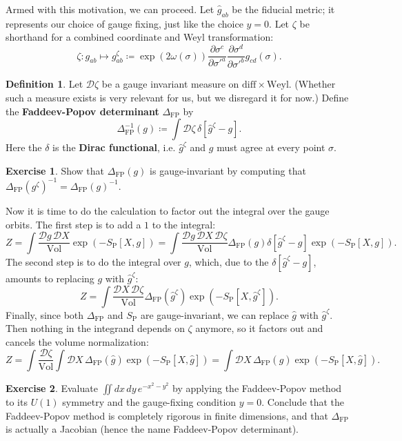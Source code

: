 \documentclass{report}
\theoremstyle{plain}
\theoremstyle{definition}
\newtheorem{definition}[theorem]{Definition}
\newtheorem{exercise}{Exercise}[section]
\theoremstyle{remark}
\newcommand{\cD}{\mathcal{D}}
\newcommand{\diff}{\mathrm{diff}}
\newcommand{\Weyl}{\mathrm{Weyl}}
\newcommand{\detFP}{\Delta_{\text{FP}}}
\DeclareMathOperator{\Vol}{Vol}
\newcommand{\pder}[2]{\frac{\partial #1}{\partial #2}}
\begin{document}
Armed with this motivation, we can proceed. Let $\hat{g}_{ab}$ be the
fiducial metric; it represents our choice of gauge fixing, just like
the choice $y = 0$. Let $\zeta$ be shorthand for a combined coordinate
and Weyl transformation:
\[ \zeta\colon g_{ab} \mapsto g^\zeta_{ab} \coloneqq \exp(2\omega(\sigma)) \pder{\sigma^c}{\sigma'^a} \pder{\sigma^d}{\sigma'^b} g_{cd}(\sigma). \]

\begin{definition}
  Let $\cD \zeta$ be a gauge invariant measure on $\diff \times
  \Weyl$. (Whether such a measure exists is very relevant for us, but
  we disregard it for now.) Define the {\bf Faddeev-Popov determinant}
  $\detFP$ by
  \[ \detFP^{-1}(g) \coloneqq \int \cD \zeta \, \delta[\hat{g}^\zeta - g]. \]
  Here the $\delta$ is the {\bf Dirac functional}, i.e.
  $\hat{g}^\zeta$ and $g$ must agree at every point $\sigma$.
\end{definition}

\begin{exercise}
  Show that $\detFP(g)$ is gauge-invariant by computing that
  $\detFP(g^\zeta)^{-1} = \detFP(g)^{-1}$.
\end{exercise}

Now it is time to do the calculation to factor out the integral over
the gauge orbits. The first step is to add a $1$ to the integral:
\[ Z = \int \frac{\cD g \, \cD X}{\Vol} \exp(-S_{\text{P}}[X, g]) = \int \frac{\cD g \, \cD X \, \cD \zeta}{\Vol} \detFP(g) \delta[\hat{g}^\zeta - g] \exp(-S_{\text{P}}[X, g]). \]
The second step is to do the integral over $g$, which, due to the
$\delta[\hat{g}^\zeta - g]$, amounts to replacing $g$ with
$\hat{g}^\zeta$:
\[ Z = \int \frac{\cD X \, \cD \zeta}{\Vol} \detFP(\hat{g}^\zeta)\exp(-S_{\text{P}}[X, \hat{g}^\zeta]). \]
Finally, since both $\detFP$ and $S_{\text{P}}$ are gauge-invariant,
we can replace $\hat{g}$ with $\hat{g}^\zeta$. Then nothing in the
integrand depends on $\zeta$ anymore, so it factors out and cancels
the volume normalization:
\[ Z = \int \frac{\cD \zeta}{\Vol} \int \cD X \, \detFP(\hat{g}) \exp(-S_{\text{P}}[X, \hat{g}]) = \int \cD X \, \detFP(\hat{g}) \exp(-S_{\text{P}}[X, \hat{g}]). \]

\begin{exercise}
  Evaluate $\iint dx \, dy \, e^{-x^2 - y^2}$ by applying the
  Faddeev-Popov method to its $U(1)$ symmetry and the gauge-fixing
  condition $y = 0$. Conclude that the Faddeev-Popov method is
  completely rigorous in finite dimensions, and that $\detFP$ is
  actually a Jacobian (hence the name Faddeev-Popov determinant).
\end{exercise}
\end{document}
